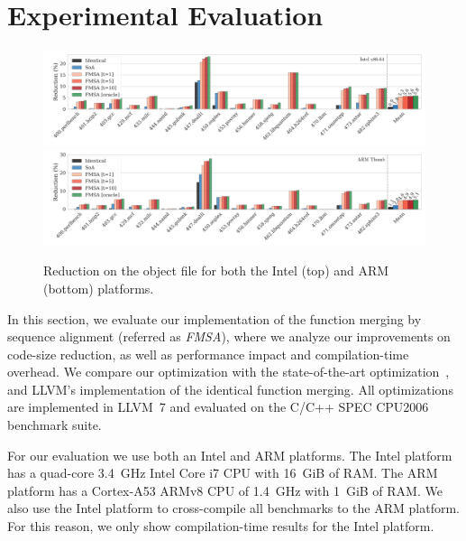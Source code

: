 \section{Experimental Evaluation}
\begin{figure}[b]
  \centering
  \includegraphics[width=\linewidth]{figs/reduction-obj-intel-label.pdf}
  \includegraphics[width=\linewidth]{figs/reduction-obj-arm-label.pdf}
  \caption{Reduction on the object file for both the Intel (top) and ARM (bottom) platforms.}
  \label{fig:reduction-obj}
\end{figure}

In this section, we evaluate our implementation of the function merging by
sequence alignment (referred as \textit{FMSA}), where we analyze our
improvements on code-size reduction, as well as performance impact and
compilation-time overhead.
We compare our optimization with the state-of-the-art optimization~\cite{edler14},
and LLVM's implementation of the identical function merging.
All optimizations are implemented in LLVM~7 and evaluated on the C/C++ SPEC
CPU2006~\cite{spec} benchmark suite.

For our evaluation we use both an Intel and ARM platforms.
The Intel platform has a quad-core 3.4~GHz Intel Core i7 CPU with 16~GiB of RAM.
The ARM platform has a Cortex-A53 ARMv8 CPU of 1.4~GHz with 1~GiB of RAM.
We also use the Intel platform to cross-compile all benchmarks to the ARM
platform.
For this reason, we only show compilation-time results for the Intel platform.

